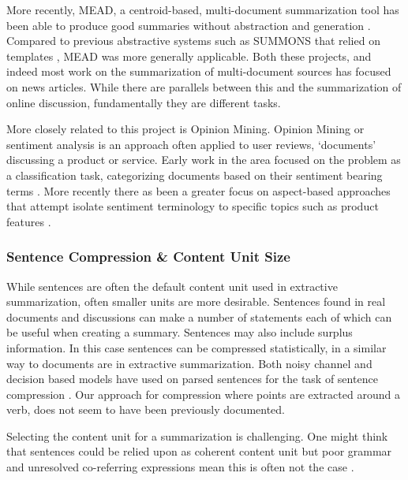         More recently, MEAD, a centroid-based, multi-document summarization tool has been able to produce good summaries without abstraction and generation \cite{radev2000centroid}. Compared to previous abstractive systems such as SUMMONS that relied on templates \cite{mckeown1995generating}, MEAD was more generally applicable. Both these projects, and indeed most work on the summarization of multi-document sources has focused on news articles. While there are parallels between this and the summarization of online discussion, fundamentally they are different tasks.

        More closely related to this project is Opinion Mining. Opinion Mining or sentiment analysis is an approach often applied to user reviews, `documents' discussing a product or service. Early work in the area focused on the problem as a classification task, categorizing documents based on their sentiment bearing terms \cite{turney2002thumbs}. More recently there as been a greater focus on aspect-based approaches that attempt isolate sentiment terminology to specific topics such as product features \cite{hu2004mining}.

      \subsubsection{Sentence Compression \& Content Unit Size}
        While sentences are often the default content unit used in extractive summarization, often smaller units are more desirable. Sentences found in real documents and discussions can make a number of statements each of which can be useful when creating a summary. Sentences may also include surplus information. In this case sentences can be compressed statistically, in a similar way to documents are in extractive summarization. Both noisy channel and decision based models have used on parsed sentences for the task of sentence compression \cite{knight2000statistics}. Our approach for compression where points are extracted around a verb, does not seem to have been previously documented.

        Selecting the content unit for a summarization is challenging. One might think that sentences could be relied upon as coherent content unit but poor grammar and unresolved co-referring expressions mean this is often not the case \cite{witbrock1999ultra}.

